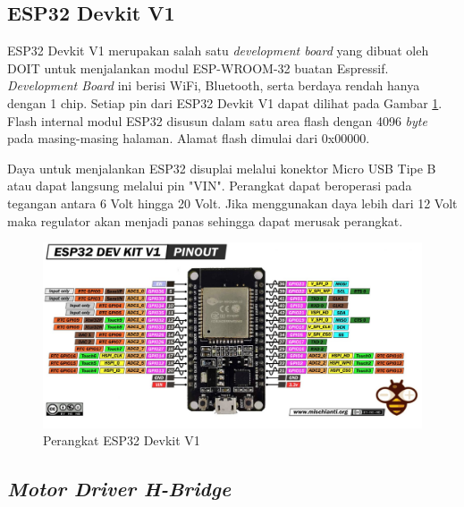 \subsection{ESP32 Devkit V1}

ESP32 Devkit V1 merupakan salah satu \emph{development board} yang dibuat oleh DOIT untuk menjalankan modul ESP-WROOM-32 buatan Espressif. \emph{Development Board} ini berisi WiFi, Bluetooth, serta berdaya rendah hanya dengan 1 chip. Setiap pin dari ESP32 Devkit V1 dapat dilihat pada Gambar \ref{fig:Perangkat ESP32}. Flash internal modul ESP32 disusun dalam satu area flash dengan 4096 \emph{byte} pada masing-masing halaman. Alamat flash dimulai dari 0x00000.

Daya untuk menjalankan ESP32 disuplai melalui konektor Micro USB Tipe B atau dapat langsung melalui pin "VIN". Perangkat dapat beroperasi pada tegangan antara 6 Volt hingga 20 Volt. Jika menggunakan daya lebih dari 12 Volt maka regulator akan menjadi panas sehingga dapat merusak perangkat.

\begin{figure} [ht] \centering
    \includegraphics[scale=0.39]{gambar/ESP32DevkitV1.jpg}
    \caption{Perangkat ESP32 Devkit V1}
    \label{fig:Perangkat ESP32}
\end{figure}
\newpage

\subsection{\emph{Motor Driver H-Bridge}}

